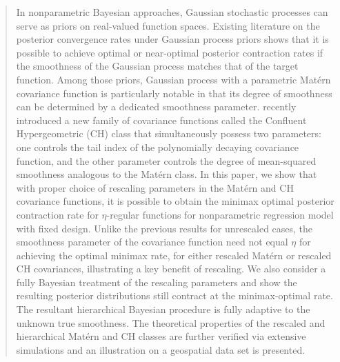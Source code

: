 \documentclass[ejs,noshowframe]{imsart}
\theoremstyle{plain}
\theoremstyle{definition}
\theoremstyle{remark}
\begin{document}
\begin{frontmatter}
\begin{abstract}
In nonparametric Bayesian approaches, Gaussian stochastic processes can serve as priors on real-valued function spaces. Existing literature on the posterior convergence rates under Gaussian process priors shows that it is possible to achieve optimal or near-optimal posterior contraction rates if the smoothness of the Gaussian process matches that of the target function. Among those priors, Gaussian process with a parametric Mat\'ern  covariance function is particularly notable in that its degree of  smoothness can be determined by a dedicated smoothness parameter.  \citet{ma2022beyond} recently introduced  a new family of covariance functions called the Confluent Hypergeometric (CH) class that  simultaneously possess two parameters: one controls the tail index of the  polynomially  decaying covariance function, and the other parameter controls the degree of  mean-squared smoothness analogous to the Mat\'ern class. In this paper, we show that with proper choice of rescaling parameters in the Mat\'ern and  CH covariance functions, it is possible to obtain the  minimax optimal posterior contraction rate for $\eta$-regular functions for  nonparametric regression model with fixed design. Unlike the previous results for unrescaled cases, the smoothness parameter of the covariance function need not equal $\eta$ for achieving the optimal minimax rate, for either rescaled Mat\'ern or rescaled CH covariances, illustrating a key benefit of rescaling.  We also consider a fully Bayesian treatment of the rescaling parameters and show the resulting posterior distributions  still contract
at the minimax-optimal rate. %
The resultant 
hierarchical Bayesian procedure is  fully adaptive to the unknown true smoothness.   The  theoretical properties of the rescaled and  hierarchical Mat\'ern and CH classes are further verified via extensive simulations and an illustration on a geospatial data set is presented. \\
\end{abstract}
\begin{keyword}[class=MSC]
\end{keyword}

\begin{keyword}
\end{keyword}
\tableofcontents
\end{frontmatter}
\end{document}
